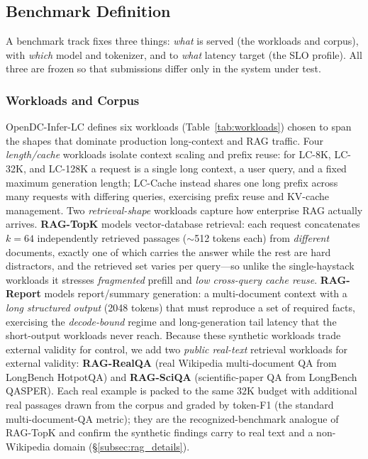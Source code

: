 \subsection{Benchmark Definition}
\label{subsec:definition}
A benchmark track fixes three things: \emph{what} is served (the workloads and
corpus), with \emph{which} model and tokenizer, and to \emph{what} latency target
(the SLO profile). All three are frozen so that submissions differ only in the
system under test.

\subsubsection{Workloads and Corpus}
\label{subsec:workloads}
OpenDC-Infer-LC defines six workloads (Table~\ref{tab:workloads}) chosen to span
the shapes that dominate production long-context and RAG traffic. Four
\emph{length/cache} workloads isolate context scaling and prefix reuse: for LC-8K,
LC-32K, and LC-128K a request is a single long context, a user query, and a fixed
maximum generation length; LC-Cache instead shares one long prefix across many
requests with differing queries, exercising prefix reuse and KV-cache management.
Two \emph{retrieval-shape} workloads capture how enterprise RAG actually arrives.
\textbf{RAG-TopK} models vector-database retrieval: each request concatenates $k{=}64$
independently retrieved passages ($\sim$512 tokens each) from \emph{different}
documents, exactly one of which carries the answer while the rest are hard
distractors, and the retrieved set varies per query---so unlike the single-haystack
workloads it stresses \emph{fragmented} prefill and \emph{low cross-query cache
reuse}. \textbf{RAG-Report} models report/summary generation: a multi-document
context with a \emph{long structured output} (2048 tokens) that must reproduce a set
of required facts, exercising the \emph{decode-bound} regime and long-generation
tail latency that the short-output workloads never reach.
Because these synthetic workloads trade external validity for control, we add two
\emph{public real-text} retrieval workloads for external validity:
\textbf{RAG-RealQA} (real Wikipedia multi-document QA from LongBench HotpotQA) and
\textbf{RAG-SciQA} (scientific-paper QA from LongBench QASPER). Each real example is
packed to the same $32$K budget with additional real passages drawn from the corpus
and graded by token-F1 (the standard multi-document-QA metric); they are the
recognized-benchmark analogue of RAG-TopK and confirm the synthetic findings carry to
real text and a non-Wikipedia domain (\S\ref{subsec:rag_details}).

